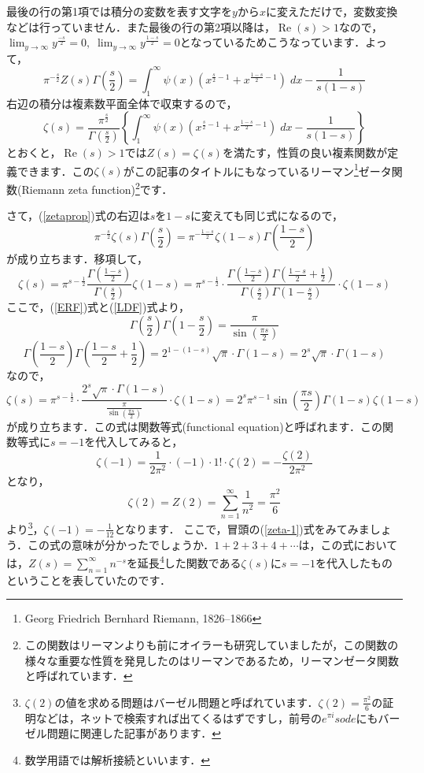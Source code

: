 \documentclass[./main]{subfile}
\begin{document}
最後の行の第1項では積分の変数を表す文字を$y$から$x$に変えただけで，変数変換などは行っていません．また最後の行の第2項以降は，$\operatorname{Re}(s)>1$なので，$\lim_{y\to\infty}y^{\frac{-s}{2}}=0,\;\lim_{y\to\infty}y^{\frac{1-s}{2}}=0$となっているためこうなっています．よって，
\begin{equation}\label{zetaprop}
\pi^{-\frac{s}{2}}Z(s)\Gamma\left(\frac{s}{2}\right)=\int_1^{\infty}\psi(x)\left(x^{\frac{s}{2}-1}+x^{\frac{1-s}{2}-1}\right)\;dx-\frac{1}{s(1-s)}
\end{equation}
右辺の積分は複素数平面全体で収束するので，
\[
\zeta(s)=\frac{\pi^{\frac{s}{2}}}{\Gamma\left(\frac{s}{2}\right)}\left\{\int_1^{\infty}\psi(x)\left(x^{\frac{s}{2}-1}+x^{\frac{1-s}{2}-1}\right)\;dx-\frac{1}{s(1-s)}\right\}
\]
とおくと，$\operatorname{Re}(s)>1$では$Z(s)=\zeta(s)$を満たす，性質の良い複素関数が定義できます．この$\zeta(s)$がこの記事のタイトルにもなっているリーマン\footnote{Georg Friedrich Bernhard Riemann, 1826--1866}ゼータ関数(Riemann zeta function)\footnote{この関数はリーマンよりも前にオイラーも研究していましたが，この関数の様々な重要な性質を発見したのはリーマンであるため，リーマンゼータ関数と呼ばれています．}です．

さて，(\ref{zetaprop})式の右辺は$s$を$1-s$に変えても同じ式になるので，
\[
\pi^{-\frac{s}{2}}\zeta(s)\Gamma\left(\frac{s}{2}\right)=\pi^{-\frac{1-s}{2}}\zeta(1-s)\Gamma\left(\frac{1-s}{2}\right)
\]
が成り立ちます．移項して，
\[
\zeta(s)=\pi^{s-\frac{1}{2}}\frac{\Gamma\left(\frac{1-s}{2}\right)}{\Gamma\left(\frac{s}{2}\right)}\zeta(1-s)=\pi^{s-\frac{1}{2}}\cdot\frac{\Gamma\left(\frac{1-s}{2}\right)\Gamma\left(\frac{1-s}{2}+\frac{1}{2}\right)}{\Gamma\left(\frac{s}{2}\right)\Gamma\left(1-\frac{s}{2}\right)}\cdot\zeta(1-s)
\]
ここで，(\ref{ERF})式と(\ref{LDF})式より，
\[
\Gamma\left(\frac{s}{2}\right)\Gamma\left(1-\frac{s}{2}\right)=\frac{\pi}{\sin\left(\frac{\pi s}{2}\right)}
\]
\[
\Gamma\left(\frac{1-s}{2}\right)\Gamma\left(\frac{1-s}{2}+\frac{1}{2}\right)=2^{1-(1-s)}\sqrt{\pi}\cdot\Gamma(1-s)=2^s\sqrt{\pi}\cdot\Gamma(1-s)
\]
なので，
\begin{equation}\label{fueq}
\zeta(s)=\pi^{s-\frac{1}{2}}\cdot\frac{2^s\sqrt{\pi}\cdot\Gamma(1-s)}{\frac{\pi}{\sin\left(\frac{\pi s}{2}\right)}}\cdot\zeta(1-s)=2^s\pi^{s-1}\sin\left(\frac{\pi s}{2}\right)\Gamma(1-s)\zeta(1-s)
\end{equation}
が成り立ちます．この式は関数等式(functional equation)と呼ばれます．この関数等式に$s=-1$を代入してみると，
\[
\zeta(-1)=\frac{1}{2\pi^2}\cdot (-1)\cdot 1!\cdot\zeta(2)=-\frac{\zeta(2)}{2\pi^2}
\]
となり，
\[
\zeta(2)=Z(2)=\sum_{n=1}^{\infty}\frac{1}{n^2}=\frac{\pi^2}{6}
\]
より\footnote{$\zeta(2)$の値を求める問題はバーゼル問題と呼ばれています．$\zeta(2)=\frac{\pi^2}{6}$の証明などは，ネットで検索すれば出てくるはずですし，前号の$e^{\pi i}sode$にもバーゼル問題に関連した記事があります．}，$\zeta(-1)=-\frac{1}{12}$となります．
ここで，冒頭の(\ref{zeta-1})式をみてみましょう．この式の意味が分かったでしょうか．$1+2+3+4+\cdots$は，この式においては，$Z(s)=\sum_{n=1}^{\infty}n^{-s}$を延長\footnote{数学用語では解析接続といいます．}した関数である$\zeta(s)$に$s=-1$を代入したものということを表していたのです．
\end{document}
